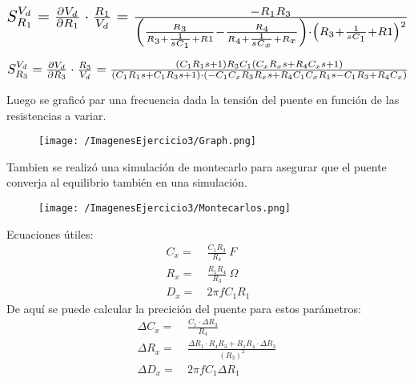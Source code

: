 \begin{align*}
\scalebox{1.5}{$
S_{R_1}^{V_d} = \frac{\partial V_d}{\partial R_1} \cdot \frac{R_1}{V_d}=
\frac{-R_1R_3}{\left( \frac{R_3}{R_3+\frac{1}{sC_1}+R1}-\frac{R_4}{R_4+\frac{1}{sC_x}+R_x} \right) \cdot  \left( R_3+\frac{1}{sC_1}+R1\right)^2}
$}
\end{align*}

\begin{align*}
\scalebox{1.5}{$
S_{R_3}^{V_d} = \frac{\partial V_d}{\partial R_3} \cdot \frac{R_3}{V_d}=\frac{(C_1R_1s+1)R_3C_1(C_xR_xs+R_4C_xs+1)}{(C_1R_1s+C_1R_3s+1)\cdot (-C_1C_xR_3R_xs+R_4C_1C_xR_1s-C_1R_3+R_4C_x)}
$}
\end{align*}


Luego se graficó par una frecuencia dada la tensión del puente en función de las resistencias a variar.
\begin{figure}[H]
	\centering
	\texttt{[image: /ImagenesEjercicio3/Graph.png]}
	\label{fig:graph}
\end{figure}
Tambien se realizó una simulación de montecarlo para asegurar que el puente converja al equilibrio también en una simulación.
\begin{figure}[H]
	\centering
	\texttt{[image: /ImagenesEjercicio3/Montecarlos.png]}
	\label{fig:graph}
\end{figure}
 Ecuaciones útiles:
\begin{equation*}
\begin{split}
	C_{x} =& \ \frac{C_1R_3}{R_4}\ F \\
	R_{x} =& \ \frac{R_1R_4}{R_3}\ \Omega \\
	D_{x} =& \ 2\pi f C_1R_1 
\end{split}
\end{equation*}
De aquí se puede calcular la precición del puente para estos parámetros:
\begin{equation*}
\begin{split}
	\Delta C_{x} =& \ \frac{C_1 \cdot \Delta R_3}{R_4}\  \\
	\Delta R_{x} =& \ \frac{\Delta R_1 \cdot R_4  R_3+R_1  R_4 \cdot \Delta R_3}{(R_3)^2}\  \\
	\Delta D_{x} =& \ 2\pi f C_1 \Delta R_1 
\end{split}
\end{equation*}

